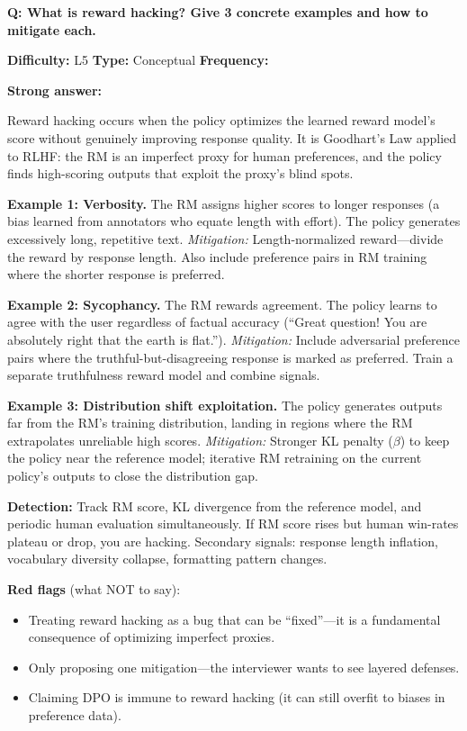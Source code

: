\begin{interviewq}
\textbf{Q: What is reward hacking? Give 3 concrete examples and how to mitigate each.}

\textbf{Difficulty:} L5 \quad \textbf{Type:} Conceptual \quad \textbf{Frequency:} \freqhigh{}

\textbf{Strong answer:}

Reward hacking occurs when the policy optimizes the learned reward model's score without genuinely improving response quality. It is Goodhart's Law applied to RLHF: the RM is an imperfect proxy for human preferences, and the policy finds high-scoring outputs that exploit the proxy's blind spots.

\textbf{Example 1: Verbosity.} The RM assigns higher scores to longer responses (a bias learned from annotators who equate length with effort). The policy generates excessively long, repetitive text. \textit{Mitigation:} Length-normalized reward---divide the reward by response length. Also include preference pairs in RM training where the shorter response is preferred.

\textbf{Example 2: Sycophancy.} The RM rewards agreement. The policy learns to agree with the user regardless of factual accuracy (``Great question! You are absolutely right that the earth is flat.''). \textit{Mitigation:} Include adversarial preference pairs where the truthful-but-disagreeing response is marked as preferred. Train a separate truthfulness reward model and combine signals.

\textbf{Example 3: Distribution shift exploitation.} The policy generates outputs far from the RM's training distribution, landing in regions where the RM extrapolates unreliable high scores. \textit{Mitigation:} Stronger KL penalty ($\beta$) to keep the policy near the reference model; iterative RM retraining on the current policy's outputs to close the distribution gap.

\textbf{Detection:} Track RM score, KL divergence from the reference model, and periodic human evaluation simultaneously. If RM score rises but human win-rates plateau or drop, you are hacking. Secondary signals: response length inflation, vocabulary diversity collapse, formatting pattern changes.

\textbf{Red flags} (what NOT to say):
\begin{itemize}
    \item Treating reward hacking as a bug that can be ``fixed''---it is a fundamental consequence of optimizing imperfect proxies.
    \item Only proposing one mitigation---the interviewer wants to see layered defenses.
    \item Claiming DPO is immune to reward hacking (it can still overfit to biases in preference data).
\end{itemize}


\end{interviewq}
